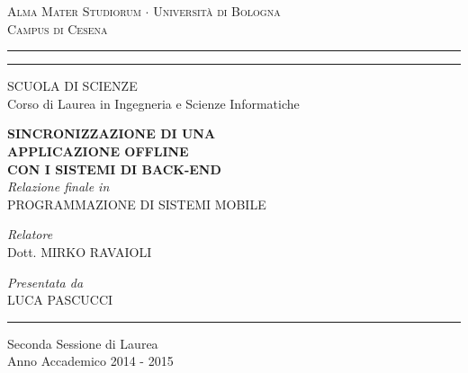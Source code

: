 \documentclass[12pt,a4paper]{report}
\begin{document}
\begin{titlepage}
\begin{center}
{{\Large{\textsc{Alma Mater Studiorum $\cdot$ Universit\`a di Bologna\\Campus di Cesena}}}} 
\rule[0.1cm]{15.8cm}{0.1mm}
\rule[0.5cm]{15.8cm}{0.6mm}
{\small SCUOLA DI SCIENZE\\
Corso di Laurea in Ingegneria e Scienze Informatiche}
\end{center}
\vspace{30mm}
\begin{center}
{\LARGE{\bf SINCRONIZZAZIONE DI UNA}}\\
\vspace{3mm}
{\LARGE{\bf APPLICAZIONE OFFLINE}}\\
\vspace{3mm}
{\LARGE{\bf CON I SISTEMI DI BACK-END}}\\
\vspace{30mm}
{\it Relazione finale in}\\
PROGRAMMAZIONE DI SISTEMI MOBILE
\end{center}
\vspace{30mm}
\par
\noindent
\begin{minipage}[t]{0.47\textwidth}
{\large {\it Relatore}\\
Dott. MIRKO RAVAIOLI}
\end{minipage}
\hfill
\begin{minipage}[t]{0.47\textwidth}\raggedleft
{\large {\it Presentata da}\\
LUCA PASCUCCI}
\end{minipage}
\vspace{20mm}
\begin{center}
\rule[0.1cm]{15.8cm}{0.1mm}
{\large Seconda Sessione di Laurea\\
Anno Accademico 2014 - 2015}
\end{center}
\end{titlepage}
\end{document}
